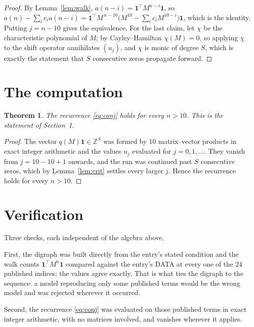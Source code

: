 \documentclass[11pt,a4paper]{article}
\theoremstyle{plain}
\newtheorem{theorem}{Theorem}
\theoremstyle{definition}
\begin{document}
\begin{proof}
By Lemma~\ref{lem:walk}, $a(n-i)=\mathbf{1}^{\!\top}M^{n-i}\mathbf{1}$, so
$a(n)-\sum_i c_i a(n-i)
=\mathbf{1}^{\!\top}M^{\,n-10}\bigl(M^{10}-\sum_i c_i M^{10-i}\bigr)
\mathbf{1}$, which is the identity. Putting $j=n-10$ gives the equivalence. For the
last claim, let $\chi$ be the characteristic polynomial of $M$; by Cayley--Hamilton
$\chi(M)=0$, so applying $\chi$ to the shift operator annihilates $(u_j)$, and $\chi$ is
monic of degree $S$, which is exactly the statement that $S$ consecutive zeros propagate
forward.
\end{proof}

\section{The computation}

\begin{theorem}
The recurrence \eqref{eq:conj} holds for every $n>10$. This is the statement of
Section~1.
\end{theorem}

\begin{proof}
The vector $q(M)\mathbf{1}\in\mathbb{Z}^{S}$ was formed by $10$ matrix--vector
products in exact integer arithmetic and the values $u_j$ evaluated for
$j=0,1,\dots$. They vanish from $j=10-10+1$ onwards, and the run was continued past
$S$ consecutive zeros, which by Lemma~\ref{lem:crit} settles every larger $j$. Hence the
recurrence holds for every $n>10$.
\end{proof}

\section{Verification}

Three checks, each independent of the algebra above.

First, the digraph was built directly from the entry's stated condition and the walk counts
$\mathbf{1}^{\!\top}M^{n}\mathbf{1}$ compared against the entry's DATA at every one of
the $24$ published indices; the values agree exactly. That is what ties the digraph to
the sequence: a model reproducing only some published terms would be the wrong model and
was rejected wherever it occurred.

Second, the recurrence \eqref{eq:conj} was evaluated on those published terms in exact
integer arithmetic, with no matrices involved, and vanishes wherever it applies.
\end{document}
